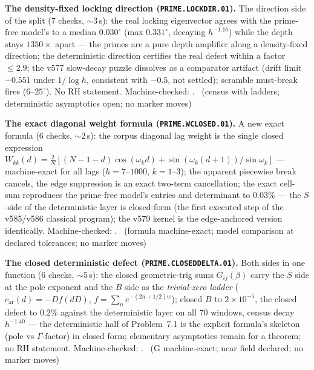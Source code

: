 \par\smallskip\noindent\textbf{The density-fixed locking direction
(\texttt{PRIME.LOCKDIR.01}).}
The direction side of the split ($7$ checks, ${\sim}3$\,s): the real
locking eigenvector agrees with the prime-free model's to a median
$0.030^\circ$ (max $0.331^\circ$, decaying $h^{-1.16}$) while the
depth stays $1350\times$ apart --- the primes are a pure depth
amplifier along a density-fixed direction; the deterministic direction
certifies the real defect within a factor $\le2.9$; the v577
slow-decay puzzle dissolves as a comparator artifact (drift limit
$-0.551$ under $1/\log h$, consistent with $-0.5$, not settled);
scramble must-break fires ($6$--$25^\circ$).  No RH statement.
Machine-checked: .
\mE\ (census with ladders; deterministic asymptotics open; no marker
moves)
\par\smallskip


\par\smallskip\noindent\textbf{The exact diagonal weight formula
(\texttt{PRIME.WCLOSED.01}).}
A new exact formula ($6$ checks, ${\sim}2$\,s): the corpus diagonal lag
weight is the single closed expression
$W_{kk}(d)=\tfrac{2}{N}[(N{-}1{-}d)\cos(\omega_k d)
+\sin(\omega_k(d{+}1))/\sin\omega_k]$ --- machine-exact for all lags
($h=7$--$1000$, $k=1$--$3$); the apparent piecewise break cancels, the
edge suppression is an exact two-term cancellation; the exact cell-sum
reproduces the prime-free model's entries and determinant to $0.03\%$
--- the $S$-side of the deterministic layer is closed-form (the first
executed step of the v585/v586 classical program); the v579 kernel is
the edge-anchored version identically. Machine-checked:
.
\mE\ (formula machine-exact; model comparison at declared tolerances;
no marker moves)
\par\smallskip


\par\smallskip\noindent\textbf{The closed deterministic defect
(\texttt{PRIME.CLOSEDDELTA.01}).}
Both sides in one function ($6$ checks, ${\sim}5$\,s): the closed
geometric-trig sums $G_{ij}(\beta)$ carry the $S$ side at the pole
exponent and the $B$ side as the \emph{trivial-zero ladder}
($c_{\mathrm{ar}}(d)=-Df(dD)$, $f=\sum_n e^{-(2n+1/2)w}$); closed $B$
to $2\times10^{-5}$, the closed defect to $0.2\%$ against the
deterministic layer on all $70$ windows, census decay $h^{-1.40}$ ---
the deterministic half of Problem~7.1 is the explicit formula's
skeleton (pole vs $\Gamma$-factor) in closed form; elementary
asymptotics remain for a theorem; no RH statement. Machine-checked:
.
\mE\ (G machine-exact; near field declared; no marker moves)
\par\smallskip


